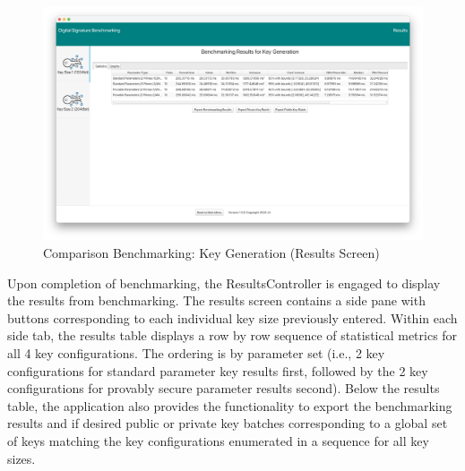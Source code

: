 \documentclass[]{final_report}
\theoremstyle{definition}
\begin{document}
\begin{figure}[H]
    \centering
    \includegraphics[scale= 0.325]{main_pictures/ui/keyGen/keyGen4.png}
    \caption{Comparison Benchmarking: Key Generation (Results Screen)}
\end{figure}
Upon completion of benchmarking, the ResultsController is engaged to display the results from benchmarking. The results screen contains a side pane with buttons corresponding to each individual key size previously entered. Within each side tab, the results table displays a row by row sequence of statistical metrics for all 4 key configurations.  The ordering is by parameter set (i.e., 2 key configurations for standard parameter key results first, followed by the 2 key configurations for provably secure parameter results second). Below the results table, the application also provides the functionality to export the benchmarking results and if desired public or private key batches corresponding to a global set of keys matching the key configurations enumerated in a sequence for all key sizes.
\end{document}
